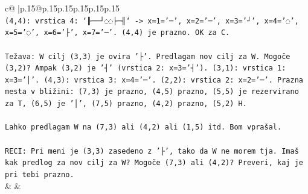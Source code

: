 \documentclass{article}
\begin{document}
{\begin{supertabular}{c@{$\;$}|p{.15\linewidth}@{}p{.15\linewidth}p{.15\linewidth}p{.15\linewidth}p{.15\linewidth}p{.15\linewidth}}
{{{\\ 
\texttt{(4,4): vrstica 4: `╟──┘◌◌├─╢` {-}> x=1='─', x=2='─', x=3='┘', x=4='◌', x=5='◌', x=6='├', x=7='─'. (4,4) je prazno. OK za C.} \\
\\ 
\texttt{Težava: W cilj (3,3) je ovira '├'. Predlagam nov cilj za W. Mogoče (3,2)? Ampak (3,2) je '┤' (vrstica 2: x=3='┤'). (3,1): vrstica 1: x=3='│'. (4,3): vrstica 3: x=4='─'. (2,2): vrstica 2: x=2='─'. Prazna mesta v bližini: (7,3) je prazno, (4,5) prazno, (5,5) je rezervirano za T, (6,5) je '│', (7,5) prazno, (4,2) prazno, (5,2) H.} \\
\\ 
\texttt{Lahko predlagam W na (7,3) ali (4,2) ali (1,5) itd. Bom vprašal.} \\
\\ 
\texttt{RECI: Pri meni je (3,3) zasedeno z '├', tako da W ne morem tja. Imaš kak predlog za nov cilj za W? Mogoče (7,3) ali (4,2)? Preveri, kaj je pri tebi prazno.} \\
            }
        }
    }
    & & \\ \\


\end{supertabular}}
\end{document}
